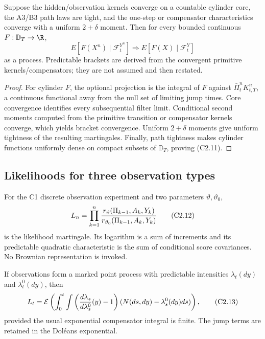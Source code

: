 \begin{theorem}
\label{thm:r29-c2-optional}
Suppose the hidden/observation kernels converge on a countable cylinder core,
the A3/B3 path laws are tight, and the one-step or compensator characteristics
converge with a uniform $2+\delta$ moment.  Then for every bounded continuous
$F:\mathbb D_T\to\R$,
\[
 E[F(X^n)\mid\mathcal F_t^{Y^n}]
 \Longrightarrow E[F(X)\mid\mathcal F_t^Y]               \tag{C2.11}
\]
as a process.  Predictable brackets are derived from the convergent primitive
kernels/compensators; they are not assumed and then restated.
\end{theorem}

\begin{proof}
For cylinder $F$, the optional projection is the integral of $F$ against
$\bar\Pi_t^nK_{t,T}^n$, a continuous functional away from the null set of
limiting jump times.  Core convergence identifies every subsequential filter
limit.  Conditional second moments computed from the primitive transition or
compensator kernels converge, which yields bracket convergence.  Uniform
$2+\delta$ moments give uniform tightness of the resulting martingales.
Finally, path tightness makes cylinder functions uniformly dense on compact
subsets of $\mathbb D_T$, proving (C2.11).
\end{proof}

\subsection{Likelihoods for three observation types}

\begin{proposition}
\label{prop:r29-c2-discrete}
For the C1 discrete observation experiment and two parameters
$\vartheta,\vartheta_0$,
\[
 L_n=\prod_{k=1}^{n}
 {r_\vartheta(\Pi_{k-1},A_k,Y_k)
  \over r_{\vartheta_0}(\Pi_{k-1},A_k,Y_k)}               \tag{C2.12}
\]
is the likelihood martingale.  Its logarithm is a sum of increments and its
predictable quadratic characteristic is the sum of conditional score
covariances.  No Brownian representation is invoked.
\end{proposition}

\begin{proposition}
\label{prop:r29-c2-point}
If observations form a marked point process with predictable intensities
$\lambda_t(dy)$ and $\lambda_t^0(dy)$, then
\[
 L_t=\mathcal E\left(\int_0^t\int
   \left({d\lambda_s\over d\lambda_s^0}(y)-1\right)
   (N(ds,dy)-\lambda_s^0(dy)ds)\right),                   \tag{C2.13}
\]
provided the usual exponential compensator integral is finite.  The jump
terms are retained in the Dol\'eans exponential.
\end{proposition}


